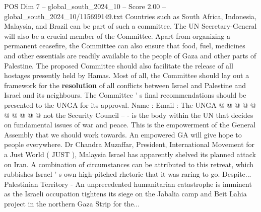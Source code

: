 \begin{textsample}{POS Dim 7 – global\_south\_2024\_10 – Score 2.00 – global\_south\_2024\_10/115699149.txt}
Countries such as South Africa, Indonesia, Malaysia, and Brazil can be part of such a committee.
The UN Secretary-General will also be a crucial member of the Committee.
Apart from organizing a permanent ceasefire, the Committee can also ensure that food, fuel, medicines and other essentials are readily available to the people of Gaza and other parts of Palestine.
The proposed Committee should also facilitate the release of all hostages presently held by Hamas.
Most of all, the Committee should lay out a framework for the \textbf{resolution} of all conflicts between Israel and Palestine and Israel and its neighbours.
The Committee ' s final recommendations should be presented to the UNGA for its approval.
Name : Email : The UNGA @ @ @ @ @ @ @ @ @ @ not the Security Council -- - is the body within the UN that decides on fundamental issues of war and peace.
This is the empowerment of the General Assembly that we should work towards.
An empowered GA will give hope to people everywhere.
Dr Chandra Muzaffar, President, International Movement for a Just World ( JUST ), Malaysia Israel has apparently shelved its planned attack on Iran.
A combination of circumstances can be attributed to this retreat, which rubbishes Israel ' s own high-pitched rhetoric that it was raring to go.
Despite...
Palestinian Territory - An unprecedented humanitarian catastrophe is imminent as the Israeli occupation tightens its siege on the Jabalia camp and Beit Lahia project in the northern Gaza Strip for the...

\end{textsample}
